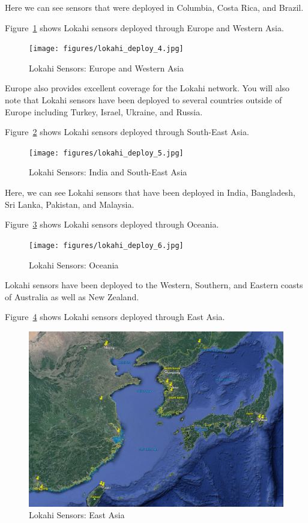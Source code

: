 Here we can see sensors that were deployed in Columbia, Costa Rica, and Brazil.

Figure~\ref{fig:lokahi_deploy_4} shows Lokahi sensors deployed through Europe and Western Asia.

\begin{figure}[H]
	\centering
	\texttt{[image: figures/lokahi\_deploy\_4.jpg]}
	\caption{Lokahi Sensors: Europe and Western Asia}
	\label{fig:lokahi_deploy_4}
\end{figure}

Europe also provides excellent coverage for the Lokahi network. You will also note that Lokahi sensors have been deployed to several countries outside of Europe including Turkey, Israel, Ukraine, and Russia.

Figure~\ref{fig:lokahi_deploy_5} shows Lokahi sensors deployed through South-East Asia.

\begin{figure}[H]
	\centering
	\texttt{[image: figures/lokahi\_deploy\_5.jpg]}
	\caption{Lokahi Sensors: India and South-East Asia}
	\label{fig:lokahi_deploy_5}
\end{figure}

Here, we can see Lokahi sensors that have been deployed in India, Bangladesh, Sri Lanka, Pakistan, and Malaysia.

Figure~\ref{fig:lokahi_deploy_6} shows Lokahi sensors deployed through Oceania.

\begin{figure}[H]
	\centering
	\texttt{[image: figures/lokahi\_deploy\_6.jpg]}
	\caption{Lokahi Sensors: Oceania}
	\label{fig:lokahi_deploy_6}
\end{figure}

Lokahi sensors have been deployed to the Western, Southern, and Eastern coasts of Australia as well as New Zealand.

Figure~\ref{fig:lokahi_deploy_7} shows Lokahi sensors deployed through East Asia.

\begin{figure}[H]
	\centering
	\includegraphics[width=\linewidth]{figures/lokahi_deploy_7.jpg}
	\caption{Lokahi Sensors: East Asia}
	\label{fig:lokahi_deploy_7}
\end{figure}

